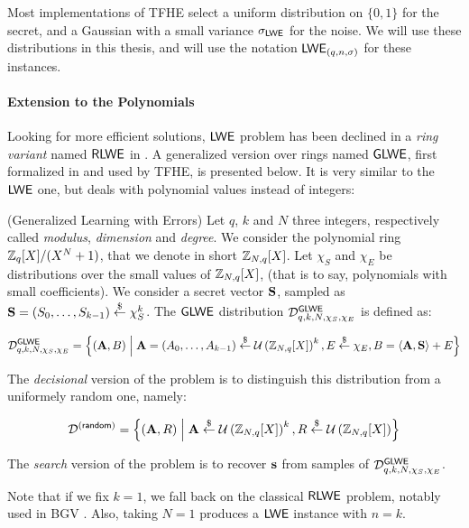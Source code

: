 Most implementations of TFHE select a uniform distribution on $\{0, 1\}$ for the secret, and a Gaussian with a small variance $\sigma_{\textsf{LWE}}$ for the noise. We will use these distributions in this thesis, and will use the notation $\textsf{LWE}_{(q, n, \sigma)}$ for these instances.



\paragraph{Extension to the Polynomials}


Looking for more efficient solutions, $\textsf{LWE}$ problem has been declined in a \textit{ring variant} named $\textsf{RLWE}$ in \cite{rlwe}. A generalized version over rings named $\textsf{GLWE}$, first formalized in \cite{EPRINT:BraGenVai11} and used by TFHE, is presented below. It is very similar to the $\textsf{LWE}$ one, but deals with polynomial values instead of integers:

\begin{definition}
	(Generalized Learning with Errors) Let $q$, $k$ and $N$ three integers, respectively called \textit{modulus}, \textit{dimension} and \textit{degree}. We consider the polynomial ring $\mathbb{Z}_q[X] / (X^N + 1)$, that we denote in short $\mathbb{Z}_{N,q}[X]$. Let $\chi_S$ and $\chi_E$ be distributions over the small values of $\mathbb{Z}_{N,q}[X]$, (that is to say, polynomials with small coefficients). We consider a secret vector $\mathbf S$, sampled as $\mathbf S = (S_0, \dots, S_{k-1}) \overset{\$}{\leftarrow} \chi_S^k$. The $\textsf{GLWE}$ distribution $\mathcal{D}_{q, k, N, \chi_S, \chi_E}^{\textsf{GLWE}}$ is defined as:
	
	\[
	\mathcal{D}_{q, k, N, \chi_S, \chi_E}^{\textsf{GLWE}} = \left \{ (\mathbf A, B) \;\middle|\; \mathbf A = (A_0, \dots, A_{k-1}) \overset{\$}{\leftarrow} \mathcal U \left ( \mathbb{Z}_{N,q}[X] \right )^k, E \overset{\$}{\leftarrow} \chi_E, B = \left \langle \mathbf A, \mathbf S \right \rangle + E \right \}
	\]
	
	The \textit{decisional} version of the problem is to distinguish this distribution from a uniformely random one, namely:
	
	\[
	\mathcal{D}^{(\textsf{random})} = \left \{(\mathbf A, R) \;\middle|\; \mathbf A \overset{\$}{\leftarrow} \mathcal U \left ( \mathbb{Z}_{N,q}[X] \right )^k, R \overset{\$}{\leftarrow} \mathcal U \left ( \mathbb{Z}_{N,q}[X] \right ) \right\}
	\]
	
	The \emph{search} version of the problem is to recover $\mathbf s$ from samples of $\mathcal{D}_{q, k , N, \chi_S, \chi_E}^{\textsf{GLWE}}$. 
	\label{def:GLWE}
	
\end{definition}

Note that if we fix $k = 1$, we fall back on the classical $\textsf{RLWE}$ problem, notably used in BGV \cite{bgv}. Also, taking $N=1$ produces a $\textsf{LWE}$ instance with $n = k$. 

